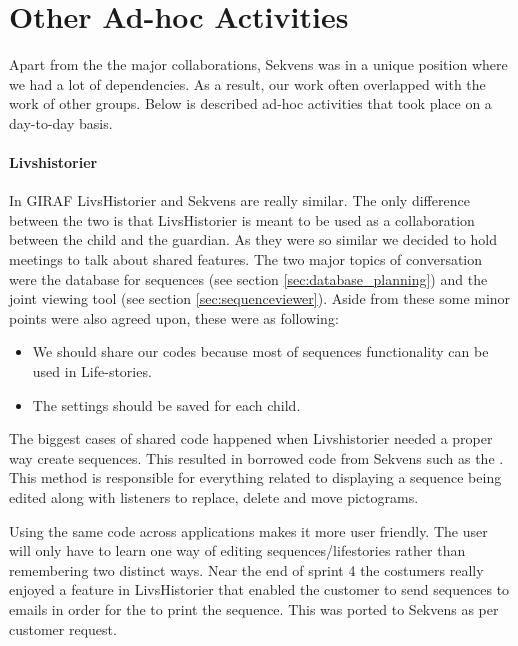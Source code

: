 \section{Other Ad-hoc Activities}\label{sec:adhoc}
Apart from the the major collaborations, Sekvens was in a unique position where we had a lot of dependencies. As a result, our work often overlapped with the work of other groups. Below is described ad-hoc activities that took place on a day-to-day basis.

\paragraph{Livshistorier} 
In GIRAF LivsHistorier and Sekvens are really similar. The only difference between the two is that LivsHistorier is meant to be used as a collaboration between the child and the guardian. As they were so similar we decided to hold meetings to talk about shared features. The two major topics of conversation were the database for sequences (see section \ref{sec:database_planning}) and the joint viewing tool (see section \ref{sec:sequenceviewer}). Aside from these some minor points were also agreed upon, these were as following:

\begin{itemize}
\item We should share our codes because most of sequences functionality can be used in Life-stories.
\item The settings should be saved for each child.
\end{itemize}

The biggest cases of shared code happened when Livshistorier needed a proper way create sequences. This resulted in borrowed code from Sekvens such as the . This method is responsible for everything related to displaying a sequence being edited along with listeners to replace, delete and move pictograms.

Using the same code across applications makes it more user friendly. The user will only have to learn one way of editing sequences/lifestories rather than remembering two distinct ways. Near the end of sprint 4 the costumers really enjoyed a feature in LivsHistorier that enabled the customer to send sequences to emails in order for the to print the sequence. This was ported to Sekvens as per customer request.

